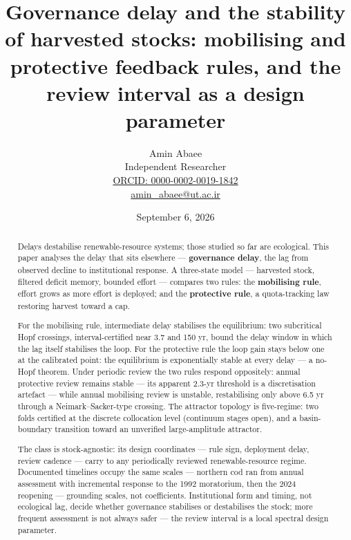 \documentclass[11pt]{article}
\begin{document}
\title{Governance delay and the stability of harvested stocks: mobilising and protective feedback rules, and the review interval as a design parameter}
\author{Amin Abaee\\[0.35em]
{\small Independent Researcher}\\[0.55em]
{\small\href{https://orcid.org/0000-0002-0019-1842}{ORCID: 0000-0002-0019-1842}}\\[0.3em]
{\small\href{mailto:amin\_abaee@ut.ac.ir}{amin\_abaee@ut.ac.ir}}}
\date{September 6, 2026}
\maketitle

\begin{abstract}


Delays destabilise renewable-resource systems; those studied so far are
ecological. This paper analyses the delay that sits elsewhere ---
\textbf{governance delay}, the lag from observed decline to
institutional response. A three-state model --- harvested stock,
filtered deficit memory, bounded effort --- compares two rules: the
\textbf{mobilising rule}, effort grows as more effort is deployed; and
the \textbf{protective rule}, a quota-tracking law restoring harvest
toward a cap.

For the mobilising rule, intermediate delay stabilises the equilibrium:
two subcritical Hopf crossings, interval-certified near 3.7 and 150 yr,
bound the delay window in which the lag itself stabilises the loop. For
the protective rule the loop gain stays below one at the calibrated
point: the equilibrium is exponentially stable at every delay --- a
no-Hopf theorem. Under periodic review the two rules respond oppositely:
annual protective review remains stable --- its apparent 2.3-yr
threshold is a discretisation artefact --- while annual mobilising
review is unstable, restabilising only above 6.5 yr through a
Neimark--Sacker-type crossing. The attractor topology is five-regime:
two folds certified at the discrete collocation level (continuum stages
open), and a basin-boundary transition toward an unverified
large-amplitude attractor.

The class is stock-agnostic: its design coordinates --- rule sign,
deployment delay, review cadence --- carry to any periodically reviewed
renewable-resource regime. Documented timelines occupy the same scales
--- northern cod ran from annual assessment with incremental response to
the 1992 moratorium, then the 2024 reopening --- grounding scales, not
coefficients. Institutional form and timing, not ecological lag, decide
whether governance stabilises or destabilises the stock; more frequent
assessment is not always safer --- the review interval is a local
spectral design parameter.

\end{abstract}
\end{document}
